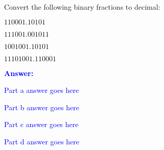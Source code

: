 \item{}
Convert the following binary fractions to decimal:
\begin{list}{\textbf{}}{}
    \item $110001.10101$
    \item $111001.001011$
    \item $1001001.10101$
    \item $11101001.110001$
\end{list}
\vskip12pt
\ifanswers
\textcolor{blue}{
\textbf{Answer:}\\
\begin{list}{\textbf{}}{}
    \item Part a answer goes here
    \item Part b answer goes here
    \item Part c answer goes here
    \item Part d answer goes here
\end{list}
}
\newpage
\fi
